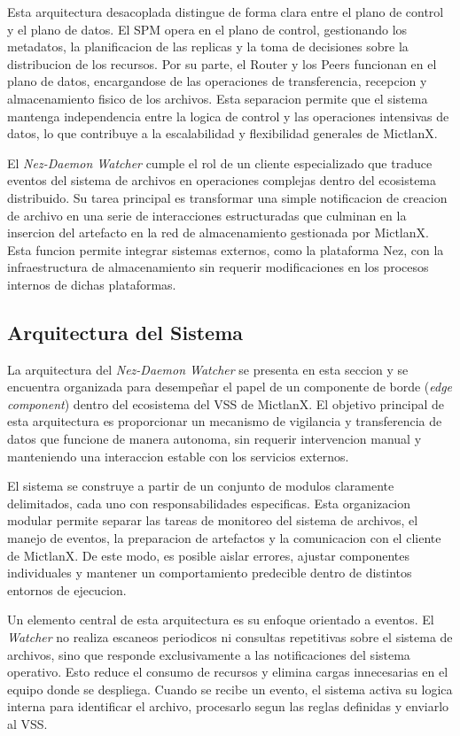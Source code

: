 Esta arquitectura desacoplada distingue de forma clara entre el plano de control y el plano de datos. El SPM opera en el plano de control, gestionando los metadatos, la planificacion de las replicas y la toma de decisiones sobre la distribucion de los recursos. Por su parte, el Router y los Peers funcionan en el plano de datos, encargandose de las operaciones de transferencia, recepcion y almacenamiento fisico de los archivos. Esta separacion permite que el sistema mantenga independencia entre la logica de control y las operaciones intensivas de datos, lo que contribuye a la escalabilidad y flexibilidad generales de MictlanX.

El \textit{Nez-Daemon Watcher} cumple el rol de un cliente especializado que traduce eventos del sistema de archivos en operaciones complejas dentro del ecosistema distribuido. Su tarea principal es transformar una simple notificacion de creacion de archivo en una serie de interacciones estructuradas que culminan en la insercion del artefacto en la red de almacenamiento gestionada por MictlanX. Esta funcion permite integrar sistemas externos, como la plataforma Nez, con la infraestructura de almacenamiento sin requerir modificaciones en los procesos internos de dichas plataformas.

\subsection{Arquitectura del Sistema}

La arquitectura del \textit{Nez-Daemon Watcher} se presenta en esta seccion y se encuentra organizada para desempeñar el papel de un componente de borde (\textit{edge component}) dentro del ecosistema del VSS de MictlanX. El objetivo principal de esta arquitectura es proporcionar un mecanismo de vigilancia y transferencia de datos que funcione de manera autonoma, sin requerir intervencion manual y manteniendo una interaccion estable con los servicios externos.

El sistema se construye a partir de un conjunto de modulos claramente delimitados, cada uno con responsabilidades especificas. Esta organizacion modular permite separar las tareas de monitoreo del sistema de archivos, el manejo de eventos, la preparacion de artefactos y la comunicacion con el cliente de MictlanX. De este modo, es posible aislar errores, ajustar componentes individuales y mantener un comportamiento predecible dentro de distintos entornos de ejecucion.

Un elemento central de esta arquitectura es su enfoque orientado a eventos. El \textit{Watcher} no realiza escaneos periodicos ni consultas repetitivas sobre el sistema de archivos, sino que responde exclusivamente a las notificaciones del sistema operativo. Esto reduce el consumo de recursos y elimina cargas innecesarias en el equipo donde se despliega. Cuando se recibe un evento, el sistema activa su logica interna para identificar el archivo, procesarlo segun las reglas definidas y enviarlo al VSS.

